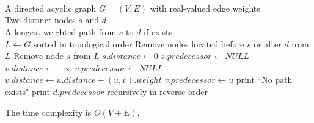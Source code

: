 \documentclass{article}
\begin{document}
\section{}
\begin{algorithm}[H]
	\begin{algorithmic}
		\Require \\
			A directed acyclic graph $G=(V,E)$ with real-valued edge weights \\
			Two distinct nodes $s$ and $d$
		\Ensure \\
			A longest weighted path from $s$ to $d$ if exists \\

		\State $L \gets G$ sorted in topological order
		\State Remove nodes located before $s$ or after $d$ from $L$
		\State Remove node $s$ from $L$
		\State $s.distance \gets 0$
		\State $s.predecessor \gets NULL$
		\State $v.distance \gets -\infty$
		\State $v.predecessor \gets NULL$
					\State $v.distance \gets u.distance + (u,v).weight$
					\State $v.predecessor \gets u$
				\EndIf
			\EndFor
		\EndFor
			\State print ``No path exists"
		\Else
			\State print $d.predecessor$ recursively in reverse order
		\EndIf
	\end{algorithmic}
\end{algorithm}

The time complexity is $O(V+E)$.

\section{}
\end{document}
